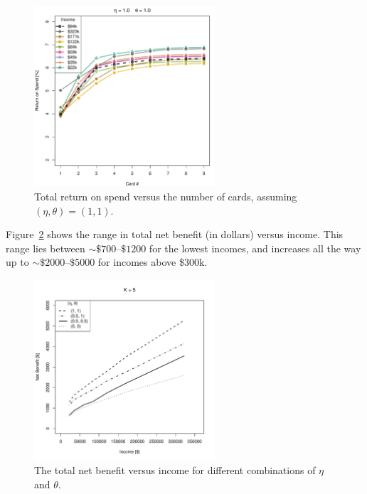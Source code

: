 \begin{figure}[tbh]
    \begin{center}
    \includegraphics[width=0.6\textwidth]{../Figures/ROSvsKvsIncome_1_1.pdf}
    \caption{Total return on spend versus the number of cards, assuming $(\eta, \theta) = (1,1)$.}
    \label{fig:ROSvsKvsIncome_1_1}
    \end{center}
\end{figure}

Figure~\ref{fig:NBvsIncome} shows the range in total net benefit (in dollars) versus income.  
This range lies between $\sim\$700$--$\$1200$ for the lowest incomes, and increases all the way up to $\sim\$2000$--$\$5000$ for incomes above \$300k.

\begin{figure}[t!bh]
    \begin{center}
    \includegraphics[width=0.6\textwidth]{../Figures/NBvsIncome_K5.pdf}
    \caption{The total net benefit versus income for different combinations of $\eta$ and $\theta$. }
    \label{fig:NBvsIncome}
    \end{center}
\end{figure}

